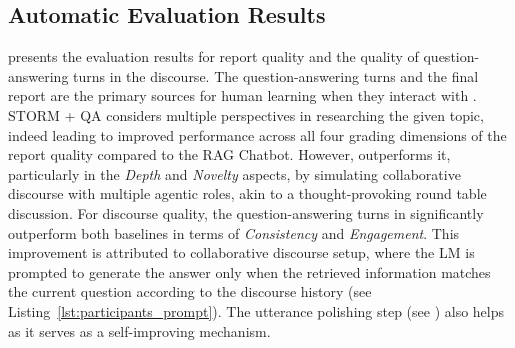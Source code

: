 \documentclass[11pt]{article}
\begin{document}
\subsection{Automatic Evaluation Results}
\label{sec:automatic_evaluation_results}
 presents the evaluation results for report quality and the quality of question-answering turns in the discourse. The question-answering turns and the final report are the primary sources for human learning when they interact with \system. STORM + QA considers multiple perspectives in researching the given topic, indeed leading to improved performance across all four grading dimensions of the report quality compared to the RAG Chatbot. However, \system outperforms it, particularly in the \textit{Depth} and \textit{Novelty} aspects, by simulating collaborative discourse with multiple agentic roles, akin to a thought-provoking round table discussion. %
For discourse quality, the question-answering turns in \system significantly outperform both baselines in terms of \textit{Consistency} and \textit{Engagement}. This improvement is attributed to collaborative discourse setup, where the LM is prompted to generate the answer only when the retrieved information matches the current question according to the discourse history (see Listing~\ref{lst:participants_prompt}). The utterance polishing step (see ) also helps as it serves as a self-improving mechanism.


\end{document}
